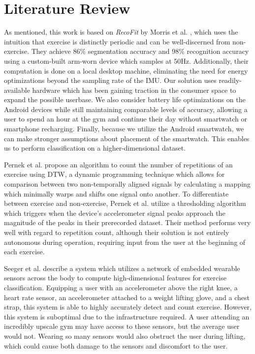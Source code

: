 \chapter{Literature Review}

As mentioned, this work is based on \textit{RecoFit} by Morris et al. \cite{recofit}, which uses the intuition that exercise is distinctly periodic and can be well-discerned from non-exercise. They achieve 86\% segmentation accuracy and 98\% recognition accuracy using a custom-built arm-worn device which samples at 50Hz. Additionally, their computation is done on a local desktop machine, eliminating the need for energy optimizations beyond the sampling rate of the IMU. Our solution uses readily-available hardware which has been gaining traction in the consumer space \cite{lit:applewatch, lit:androidwear} to expand the possible userbase. We also consider battery life optimizations on the Android devices while still maintaining comparable levels of accuracy, allowing a user to spend an hour at the gym and continue their day without smartwatch or smartphone recharging. Finally, because we utilize the Android smartwatch, we can make stronger assumptions about placement of the smartwatch. This enables us to perform classification on a higher-dimensional dataset.

Pernek et al. \cite{dtw} propose an algorithm to count the number of repetitions of an exercise using DTW, a dynamic programming technique which allows for comparison between two non-temporally aligned signals by calculating a mapping which minimally warps and shifts one signal onto another. To differentiate between exercise and non-exercise, Pernek et al. utilize a thresholding algorithm which triggers when the device's accelerometer signal peaks approach the magnitude of the peaks in their prerecorded dataset. Their method performs very well with regard to repetition count, although their solution is not entirely autonomous during operation, requiring input from the user at the beginning of each exercise.

Seeger et al. \cite{seeger} describe a system which utilizes a network of embedded wearable sensors across the body to compute high-dimensional features for exercise classification. Equipping a user with an accelerometer above the right knee, a heart rate sensor, an accelerometer attached to a weight lifting glove, and a chest strap, this system is able to highly accurately detect and count exercise. However, this system is suboptimal due to the infrastructure required. A user attending an incredibly upscale gym may have access to these sensors, but the average user would not. Wearing so many sensors would also obstruct the user during lifting, which could cause both damage to the sensors and discomfort to the user. 


